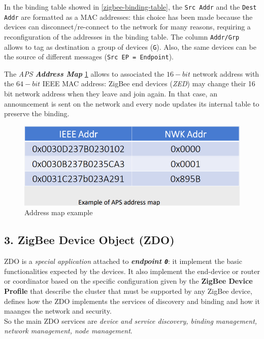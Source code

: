 \documentclass[10pt,a4paper]{report}
\theoremstyle{definition}
\begin{document}
In the binding table showed in \ref{zigbee-binding-table}, the \texttt{Src Addr} and the \texttt{Dest Addr} are formatted as a MAC addresses: this choice has been made because the devices can disconnect/re-connect to the network for many reasons, requiring a reconfiguration of the addresses in the binding table.
The column \texttt{Addr/Grp} allows to tag as destination a group of devices (\texttt{G}). Also, the same devices can be the source of different messages (\texttt{Src EP = Endpoint}).

The \textit{APS \textbf{Address Map}} \ref{zigbee-addr-map} allows to associated the $16-bit$ network address with the $64-bit$ IEEE MAC address: ZigBee end devices (\textit{ZED}) may change their 16 bit network address when they leave and join again. In that case, an announcement is sent on the network and every node updates its internal table to preserve the binding.
\begin{figure}[h]
	\centering\includegraphics[scale=0.30]{images/Pasted image 20230311163736.png}
	\caption{Address map example}\label{zigbee-addr-map}
\end{figure}



\subsection{3. ZigBee Device Object (ZDO)}\label{sec:3-zigbee-device-object-zdo}
ZDO is a \textit{special application} attached to \textit{\textbf{endpoint \texttt{0}}}: it implement the basic functionalities expected by the devices. It also implement the end-device or router or coordinator based on the specific configuration given by the \textbf{ZigBee Device Profile} that describe the cluster that must be supported by any ZigBee device, defines how the ZDO implements the services of discovery and binding and how it maanges the network and security.\\
So the main ZDO services are \textit{device and service discovery, binding management, network management, node management}.
\end{document}
